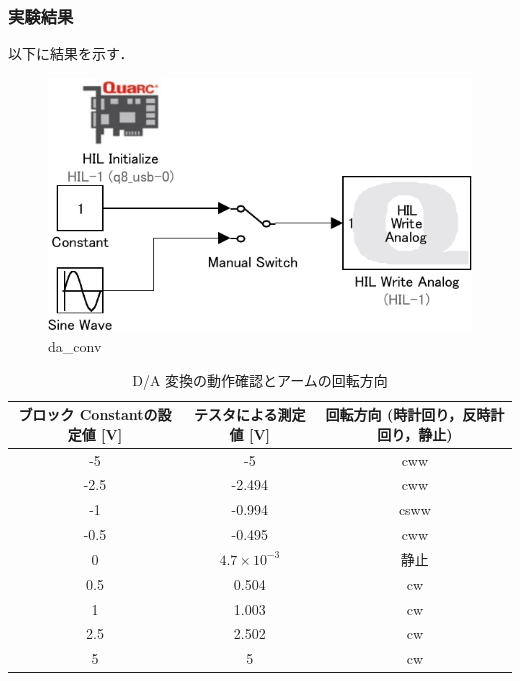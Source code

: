 \subsubsection{実験結果}
以下に結果を示す．

\begin{figure}[h]
  \centering
  \includegraphics[scale=1]{sozai/da_conv-crop.pdf}
  \caption{da\_conv}
\end{figure}

\newpage

\begin{table}[h]
  \centering
  \caption{D/A 変換の動作確認とアームの回転方向}
  \begin{tabular}{|c|c|c|}
    \hline
    ブロック Constantの設定値 [V] & テスタによる測定値 [V] & 回転方向 (時計回り，反時計回り，静止) \\ \hline
    -5                            & -5                     & cww                                   \\ \hline
    -2.5                          & -2.494                 & cww                                   \\ \hline
    -1                            & -0.994                 & csww                                  \\ \hline
    -0.5                          & -0.495                 & cww                                   \\ \hline
    0                             & \(4.7×10^{-3}\)        & 静止                                  \\ \hline
    0.5                           & 0.504                  & cw                                    \\ \hline
    1                             & 1.003                  & cw                                    \\ \hline
    2.5                           & 2.502                  & cw                                    \\ \hline
    5                             & 5                      & cw                                    \\ \hline
  \end{tabular}
\end{table}

